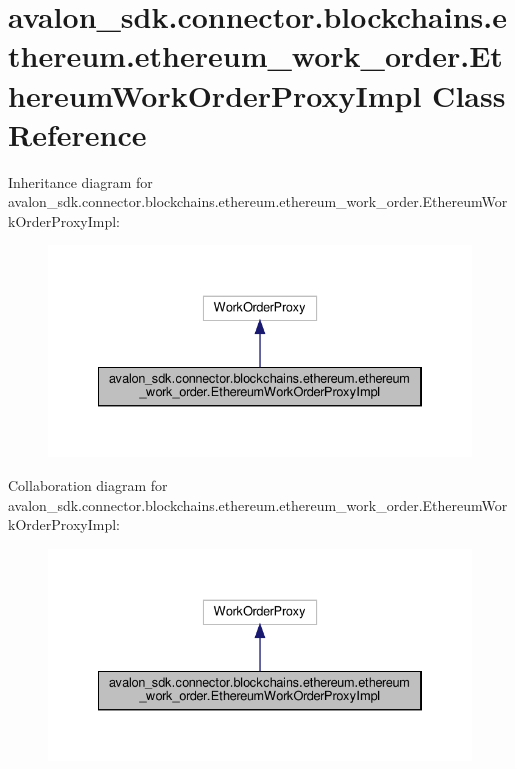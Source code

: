 \hypertarget{classavalon__sdk_1_1connector_1_1blockchains_1_1ethereum_1_1ethereum__work__order_1_1EthereumWorkOrderProxyImpl}{}\section{avalon\+\_\+sdk.\+connector.\+blockchains.\+ethereum.\+ethereum\+\_\+work\+\_\+order.\+Ethereum\+Work\+Order\+Proxy\+Impl Class Reference}
\label{classavalon__sdk_1_1connector_1_1blockchains_1_1ethereum_1_1ethereum__work__order_1_1EthereumWorkOrderProxyImpl}


Inheritance diagram for avalon\+\_\+sdk.\+connector.\+blockchains.\+ethereum.\+ethereum\+\_\+work\+\_\+order.\+Ethereum\+Work\+Order\+Proxy\+Impl\+:
\nopagebreak
\begin{figure}[H]
\begin{center}
\leavevmode
\includegraphics[width=334pt]{classavalon__sdk_1_1connector_1_1blockchains_1_1ethereum_1_1ethereum__work__order_1_1EthereumWorkOrderProxyImpl__inherit__graph}
\end{center}
\end{figure}


Collaboration diagram for avalon\+\_\+sdk.\+connector.\+blockchains.\+ethereum.\+ethereum\+\_\+work\+\_\+order.\+Ethereum\+Work\+Order\+Proxy\+Impl\+:
\nopagebreak
\begin{figure}[H]
\begin{center}
\leavevmode
\includegraphics[width=334pt]{classavalon__sdk_1_1connector_1_1blockchains_1_1ethereum_1_1ethereum__work__order_1_1EthereumWorkOrderProxyImpl__coll__graph}
\end{center}
\end{figure}
